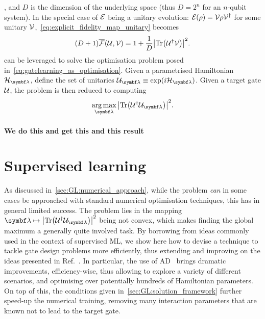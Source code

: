 , and
$D$ is the dimension of the underlying space (thus $D=2^n$ for an $n$-qubit system).
In the special case of ${\mathcal{E}}$ being a unitary evolution: ${\mathcal{E}}(\rho)={\mathcal{V}}\rho {\mathcal{V}}^\dagger$ for some unitary ${\mathcal{V}}$,~\cref{eq:explicit_fidelity_map_unitary} becomes
\begin{equation}
    (D+1) \overline{{\mathcal{F}}}({\mathcal{U}}, {\mathcal{V}}) =
    1 + \frac{1}{D} \abs{\Tr({\mathcal{U}}^\dagger {\mathcal{V}})}^2.
    \label{eq:explicit_fidelity_unitary_unitary}
\end{equation}
 can be leveraged to solve the optimisation problem posed in~\cref{eq:gatelearning_as_optimisation}.
Given a parametrised Hamiltonian $\calH_{\bslambda}$, define the set of unitaries $\calU_{\bslambda}\equiv\exponential(i\calH_{\bslambda})$. Given a target gate ${\mathcal{U}}$, the problem is then reduced to computing
\begin{equation}
    \argmax_{\bslambda} \abs{\Tr(\calU^\dagger \calU_{\bslambda})}^2.
\end{equation}

\paragraph{We do this and get this and this result}




\section{Supervised learning}
\label{sec:GL:supervised_learning}

As discussed in~\cref{sec:GL:numerical_approach}, while the problem \emph{can} in some cases be approached with standard numerical optimisation techniques, this has in general limited success.
The problem lies in the mapping $\bslambda\mapsto\abs{\Tr(\calU^\dagger \calU_{\bslambda})}^2$ being not convex, which makes finding the global maximum a generally quite involved task.
By borrowing from ideas commonly used in the context of supervised \ac{ML}, we show here how to devise a technique to tackle gate design problems more efficiently, thus extending and improving on the ideas presented in Ref.~\cite{banchi2016quantum}.
In particular, the use of \ac{AD}~\cite{baydin2018automatic,bartholomewbiggs2000automatic,wengert1964a,bischof2008advances} brings dramatic improvements, efficiency-wise, thus allowing to explore a variety of different scenarios, and optimising over potentially hundreds of Hamiltonian parameters.
On top of this, the conditions given in~\cref{sec:GL:solution_framework} further speed-up the numerical training, removing many interaction parameters that are known not to lead to the target gate.

